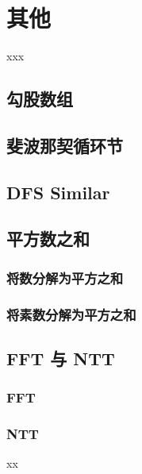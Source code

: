 \chapter{其他}
\begin{introduction}[本章内容提要]
	\item xxx
\end{introduction}

\section{勾股数组}


\section{斐波那契循环节}


\section{DFS Similar}


\section{平方数之和}

\subsection{将数分解为平方之和}


\subsection{将素数分解为平方之和}

\section{FFT 与 NTT}

\subsection{FFT}

\subsection{NTT}

\begin{problemset}
	\item xx
\end{problemset}


\nocite{*} 

